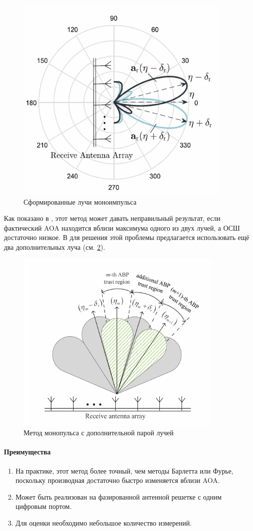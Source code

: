 \begin{figure}[h]
    \centering
    \includegraphics[width=0.45\linewidth]{figs/fig3.13}
    \caption{Сформированные лучи моноимпульса \cite{Zhu2016}}
    \label{fig:}
\end{figure}

Как показано в  \cite{Sherman2011},
этот метод может давать неправильный результат, если фактический AOA
находится вблизи максимума одного из двух лучей, а ОСШ достаточно низкое. 
В \cite{Sherman2011} для решения этой проблемы предлагается использовать ещё два дополнительных луча (см. \ref{fig:3.14}).

\begin{figure}[h]
    \centering
    \includegraphics[width=0.6\linewidth]{figs/fig3.14}
    \caption{Метод монопульса с дополнительной парой лучей \cite{Tuncer2009}}
    \label{fig:3.14}
\end{figure}

\paragraph{Преимущества}%
\label{par:preimushchestva}

\begin{enumerate}
    \item На практике, этот метод более точный, чем методы Барлетта или Фурье, поскольку производная достаточно быстро изменяется вблизи AOA.
    \item Может быть реализован на фазированной антенной решетке с одним цифровым портом.
    \item Для оценки необходимо небольшое количество измерений. 
\end{enumerate}

